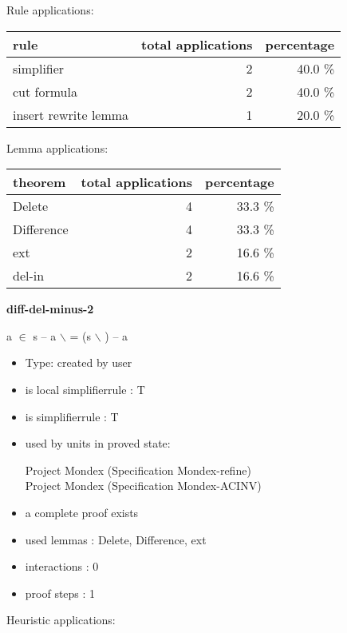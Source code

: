 \documentclass[a4paper]{article}
\begin{document}
Rule applications:

\begin{supertabular}{l|r|r}
rule	        & total applications & percentage \\ \hline
simplifier & 2 & 40.0 \% \\
cut formula & 2 & 40.0 \% \\
insert rewrite lemma & 1 & 20.0 \% \\

\end{supertabular}

Lemma applications:

\begin{supertabular}{l|r|r}
theorem	        & total applications & percentage \\ \hline
Delete & 4 & 33.3 \% \\
Difference & 4 & 33.3 \% \\
ext & 2 & 16.6 \% \\
del-in & 2 & 16.6 \% \\

\end{supertabular}
\pagebreak

{\LARGE\bf diff-del-minus-2}\label{lemma-diff-del-minus-2}

\medskip

 \Fol \Not a $\in$  \Imp s -- a $\backslash$  = (s $\backslash$ ) -- a

\begin{itemize}

\item Type: created by user

\item is local simplifierrule : T
\item is simplifierrule : T
\item used by units in proved state:

Project Mondex (Specification Mondex-refine) \\
Project Mondex (Specification Mondex-ACINV)
\item       a complete proof exists
\item       used lemmas  : Delete, Difference, ext
\item       interactions : 0
\item       proof steps  : 1
\end{itemize}

\medskip


Heuristic applications:
\end{document}
